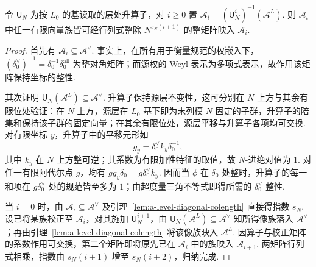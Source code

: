 \begin{lemma}[升算子迭代的余长]
\label{lem:a-level-up-iterate}
\emitthmsource
令 $\mathsf U_N$ 为按 $L_0$ 的基读取的层处升算子，对 $i\ge0$ 置 $\mathcal A_i=(\mathsf U_N^i)^{-1}(\mathcal A^L)$. 则 $\mathcal A_\iota$ 中任一有限向量族皆可经行列式整除 $N^{s_N(i+1)}$ 的整矩阵映入 $\mathcal A_i$.
\end{lemma}
\begin{proof}
首先有 $\mathcal A_\iota\subseteq\mathcal A^\vee$. 事实上，在所有用于衡量规范的权嵌入下，$(\delta_0^\vee)^{-1}=\delta_0^{-1}\delta_0^{\mathrm{all}}$ 为整对角矩阵；而源权的 Weyl 表示为多项式表示，故作用该矩阵保持坐标的整性.

其次证明 $\mathsf U_N(\mathcal A^L)\subseteq\mathcal A^\vee$. 升算子保持源层不变性，这可分别在 $N$ 上方与其余有限位处验证：在 $N$ 上方，源层在 $L_0$ 基下即为末列模 $N$ 固定的子群，升算子的陪集和保持该子群的固定向量；在其余有限位处，源层平移与升算子各项均可交换. 对有限坐标 $y$，升算子中的平移元形如
\[
 g_y=\delta_0^\vee k_y\delta_0^{-1},
\]
其中 $k_y$ 在 $N$ 上方整可逆；其系数为有限加性特征的取值，故 $N$-进绝对值为 $1$. 对任一有限阿代尔点 $g$，均有
$gg_y\delta_0=g\delta_0^\vee k_y$. 因而当 $\phi$ 在 $\delta_0$ 处整时，升算子的每一和项在 $g\delta_0^\vee$ 处的规范皆至多为 $1$；由超度量三角不等式即得所需的 $\delta_0^\vee$ 整性.

当 $i=0$ 时，由 $\mathcal A_\iota\subseteq\mathcal A^\vee$ 及引理~\ref{lem:a-level-diagonal-colength} 直接得指数 $s_N$. 设已将某族校正至 $\mathcal A_i$，对其施加 $\mathsf U_N^{i+1}$，由 $\mathsf U_N(\mathcal A^L)\subseteq\mathcal A^\vee$ 知所得像族落入 $\mathcal A^\vee$；再由引理~\ref{lem:a-level-diagonal-colength} 将该像族映入 $\mathcal A^L$. 因算子与校正矩阵的系数作用可交换，第二个矩阵即将原先已在 $\mathcal A_i$ 中的族映入 $\mathcal A_{i+1}$. 两矩阵行列式相乘，指数由 $s_N(i+1)$ 增至 $s_N(i+2)$，归纳完成.
\end{proof}

